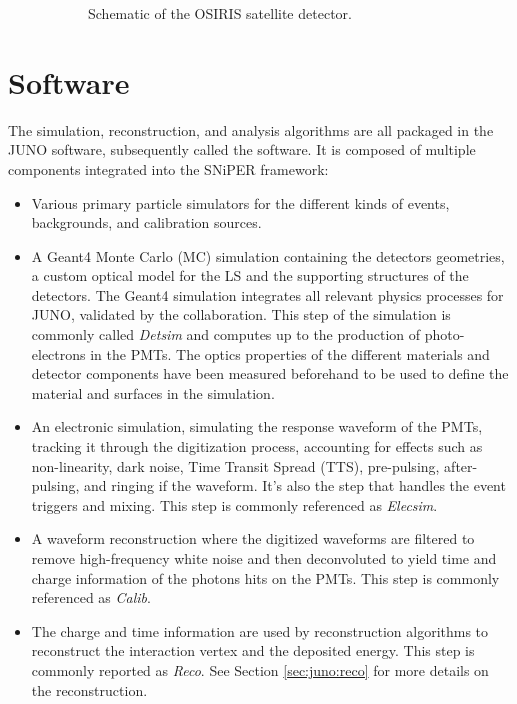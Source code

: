 \documentclass[../main.tex]{subfiles}
\begin{document}
\begin{figure}[ht]
\begin{subfigure}[t]{0.49\linewidth}
    \caption{Schematic of the OSIRIS satellite detector.}
    \label{fig:juno:osiris}
  \end{subfigure}
  \caption{}
\end{figure}

\section{Software}
\label{sec:juno:software}

The simulation, reconstruction, and analysis algorithms are all packaged in the JUNO software, subsequently called the software.
It is composed of multiple components integrated into the SNiPER \cite{lin_application_2017} framework:

\begin{itemize}
  \item Various primary particle simulators for the different kinds of events, backgrounds, and calibration sources.
  \item A Geant4 \cite{agostinelli_geant4simulation_2003, allison_geant4_2006, allison_recent_2016} Monte Carlo (MC) simulation containing the detectors geometries, a custom optical model for the LS and the supporting structures of the detectors. The Geant4 simulation integrates all relevant physics processes for JUNO, validated by the collaboration. This step of the simulation is commonly called \textit{Detsim} and computes up to the production of photo-electrons in the PMTs. The optics properties of the different materials and detector components have been measured beforehand to be used to define the material and surfaces in the simulation.
  \item An electronic simulation, simulating the response waveform of the PMTs, tracking it through the digitization process, accounting for effects such as non-linearity, dark noise, Time Transit Spread (TTS), pre-pulsing, after-pulsing, and ringing if the waveform. It's also the step that handles the event triggers and mixing. This step is commonly referenced as \textit{Elecsim}.
  \item A waveform reconstruction where the digitized waveforms are filtered to remove high-frequency white noise and then deconvoluted to yield time and charge information of the photons hits on the PMTs. This step is commonly referenced as \textit{Calib}.
  \item The charge and time information are used by reconstruction algorithms to reconstruct the interaction vertex and the deposited energy. This step is commonly reported as \textit{Reco}. See Section \ref{sec:juno:reco} for more details on the reconstruction.

\end{itemize}
\end{document}
